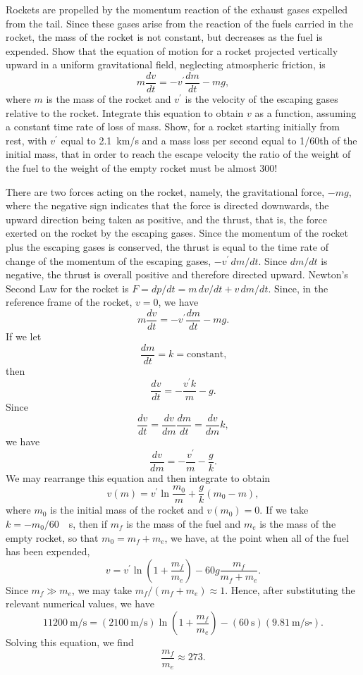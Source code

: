 \begin{questions}
\question Rockets are propelled by the momentum reaction of the exhaust gases expelled from the tail. Since these gases arise from the reaction of the fuels carried in the rocket, the mass of the rocket is not constant, but decreases as the fuel is expended. Show that the equation of motion for a rocket projected vertically upward in a uniform gravitational field, neglecting atmospheric friction, is
\[
m \frac{dv}{dt} = -v^\prime \frac{dm}{dt} - m g,
\]
where $m$ is the mass of the rocket and $v^\prime$ is the velocity of the escaping gases relative to the rocket. Integrate this equation to obtain $v$ as a function, assuming a constant time rate of loss of mass. Show, for a rocket starting initially from rest, with $v^\prime$ equal to \SI{2.1}{\km/\s} and a mass loss per second equal to 1/60th of the initial mass, that in order to reach the escape velocity the ratio of the weight of the fuel to the weight of the empty rocket must be almost 300!
\begin{solution}
There are two forces acting on the rocket, namely, the gravitational force, $-m g$, where the negative sign indicates that the force is directed downwards, the upward direction being taken as positive, and the thrust, that is, the force exerted on the rocket by the escaping gases. Since the momentum of the rocket plus the escaping gases is conserved, the thrust is equal to the time rate of change of the momentum of the escaping gases, $-v^\prime \, dm / dt$. Since $dm/dt$ is negative, the thrust is overall positive and therefore directed upward. Newton's Second Law for the rocket is $F = dp / dt = m \, dv / dt + v \, dm / dt$. Since, in the reference frame of the rocket, $v = 0$, we have
\[
m \frac{dv}{dt} = -v^\prime \frac{dm}{dt} - mg.
\]
If we let
\[
\frac{dm}{dt} = k = \text{constant,}
\]
then
\[
\frac{dv}{dt} = -\frac{v^\prime k}{m} - g.
\]
Since
\[
\frac{dv}{dt} = \frac{dv}{dm} \frac{dm}{dt} = \frac{dv}{dm} k,
\]
we have
\[
\frac{dv}{dm} = -\frac{v^\prime}{m} - \frac{g}{k}.
\]
We may rearrange this equation and then integrate to obtain
\[
v(m) = v^\prime \ln \frac{m_0}{m} + \frac{g}{k} (m_0 - m),
\]
where $m_0$ is the initial mass of the rocket and $v(m_0) = 0$. If we take $k = -m_0 / 60$~\si{\per\s}, then if $m_f$ is the mass of the fuel and $m_e$ is the mass of the empty rocket, so that $m_0 = m_f + m_e$, we have, at the point when all of the fuel has been expended,
\[
v = v^\prime \ln \left( 1 + \frac{m_f}{m_e} \right) - 60 g \frac{m_f}{m_f + m_e}.
\]
Since $m_f \gg m_e$, we may take $m_f / (m_f + m_e ) \approx 1$. Hence, after substituting the relevant numerical values, we have 
\[
\SI{11200}{\m/\s} = ( \SI{2100}{\m/\s} ) \ln \left( 1 + \frac{m_f}{m_e} \right) - ( \SI{60}{\s} ) ( \SI{9.81}{\m/\s\square} ).
\]
Solving this equation, we find
\[
\frac{m_f}{m_e} \approx 273.
\]
\end{solution}


\end{questions}

